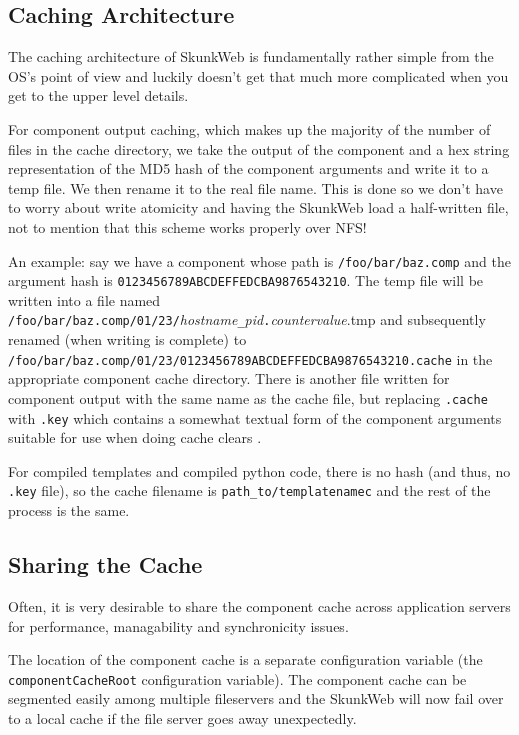 \documentclass[titlepage]{manual}
\begin{document}
\subsection{Caching Architecture}
The caching architecture of SkunkWeb is fundamentally rather simple
from the OS's point of view and luckily doesn't get that much more
complicated when you get to the upper level details.

For component output caching, which makes up the majority of the
number of files in the cache directory, we take the output of the
component and a hex string representation of the MD5 hash of the
component arguments and write it to a temp file. We then rename it
to the real file name. This is done so we don't have to worry about
write atomicity and having the SkunkWeb load a half-written file,
not to mention that this scheme works properly over NFS!

An example: say we have a component whose path is
\texttt{/foo/bar/baz.comp} and the argument hash is
\texttt{0123456789ABCDEFFEDCBA9876543210}. The temp file will be
written into a file named
\texttt{/foo/bar/baz.comp/01/23/}\emph{hostname}\texttt{\_}\emph{pid}\texttt{.}\emph{countervalue}.tmp
and subsequently renamed (when writing is complete) to
\texttt{/foo/bar/baz.comp/01/23/0123456789ABCDEFFEDCBA9876543210.cache}
in the appropriate component cache directory. There is another file
written for component output with the same name as the cache file, but
replacing \texttt{.cache} with \texttt{.key} which contains a somewhat
textual form of the component arguments suitable for use when doing
cache clears .

For compiled templates and compiled python code, there is no hash (and
thus, no \texttt{.key} file), so the cache filename is
\texttt{path\_to/templatenamec} and the rest of the process is the
same.

\subsection{Sharing the Cache}
Often, it is very desirable to share the component cache across
application servers for performance, managability and synchronicity
issues. 

The location of the component cache is a separate configuration
variable (the \texttt{componentCacheRoot} configuration variable). The
component cache can be segmented easily among multiple fileservers and
the SkunkWeb will now fail over to a local cache if the file server
goes away unexpectedly.
   
\end{document}
